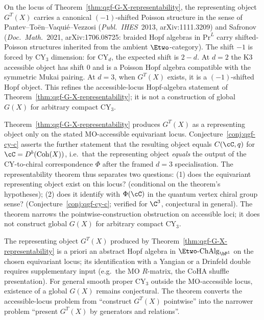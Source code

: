 \begin{remark}
\label{rem:qgf-G-X-shifted-poisson}
On the locus of Theorem~\ref{thm:qgf-G-X-representability}, the
representing object \(G^T(X)\) carries a canonical \((-1)\)-shifted
Poisson structure in the sense of Pantev--To\"en--Vaqui\'e--Vezzosi
(\emph{Publ.\ IHES}\ 2013, arXiv:1111.3209) and Safronov
(\emph{Doc.\ Math.}\ 2021, arXiv:1706.08725: braided Hopf algebras in
\(\mathrm{Pr}^L\) carry shifted-Poisson structures inherited from the
ambient \(\Etwo\)-category). The shift \(-1\) is forced by CY$_3$
dimension: for CY$_d$, the expected shift is \(2-d\). At \(d=2\) the
K3 accessible object has shift \(0\) and is a Poisson Hopf algebra
compatible with the symmetric Mukai pairing. At \(d=3\), when \(G^T(X)\)
exists, it is a \((-1)\)-shifted Hopf object. This refines the
accessible-locus Hopf-algebra statement of
Theorem~\ref{thm:qgf-G-X-representability}; it is not a construction of
global \(G(X)\) for arbitrary compact CY$_3$.
\end{remark}

\begin{remark}
\label{rem:qgf-G-X-vs-conj-CY-C}
Theorem~\ref{thm:qgf-G-X-representability} produces $G^T(X)$ as a representing object only on the stated MO-accessible equivariant locus. Conjecture~\ref{conj:qgf-cy-c} asserts the further statement that the resulting object equals $C(\cC, q)$ for $\cC = D^b(\mathrm{Coh}(X))$, i.e.\ that the representing object \emph{equals} the output of the CY-to-chiral correspondence $\Phi$ after the framed $d=3$ specialisation. The representability theorem thus separates two questions: (1) does the equivariant representing object exist on this locus? (conditional on the theorem's hypotheses); (2) does it identify with $\Phi(\cC)$ in the quantum vertex chiral group sense? (Conjecture~\ref{conj:qgf-cy-c}; verified for $\C^3$, conjectural in general). The theorem narrows the pointwise-construction obstruction on accessible loci; it does not construct global $G(X)$ for arbitrary compact CY$_3$.
\end{remark}

\begin{remark}
\label{rem:qgf-G-X-scope}
The representing object $G^T(X)$ produced by Theorem~\ref{thm:qgf-G-X-representability} is a priori an abstract Hopf algebra in $\Etwo\text{-}\mathrm{ChAlg}_{\bP^1}$ on the chosen equivariant locus; its identification with a Yangian or a Drinfeld double requires supplementary input (e.g.\ the MO $R$-matrix, the CoHA shuffle presentation). For general smooth proper CY$_3$ outside the MO-accessible locus, existence of a global $G(X)$ remains conjectural. The theorem converts the accessible-locus problem from ``construct $G^T(X)$ pointwise'' into the narrower problem ``present $G^T(X)$ by generators and relations''.
\end{remark}


